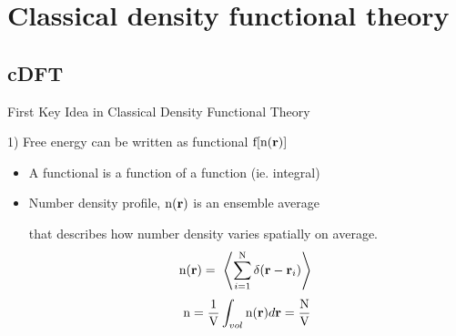 \documentclass{beamer}
\renewcommand{\vec}[1]{\mathbf{#1}}
\begin{document}
\section*{Classical density functional theory}
\subsection*{cDFT}
\begin{frame}{First Key Idea in Classical Density Functional Theory}
    \begin{block}{1) Free energy can be written as functional $\text f[\text{n}(\vec r)]$}  
       \begin{itemize}
          \item A functional is a function of a function (ie. integral)
          \item Number density profile, $\text n(\vec{r})$ is an ensemble average
          
           that describes how number density varies spatially on average. 
          \begin{displaymath}\text n(\vec r)=~\left<\sum_{i=1}^{\text N}\delta(\vec r - \vec r_i)\right>~\end{displaymath} 
          \begin{displaymath} \text n=\frac{1}{\text V}\int_{vol}{\text n(\vec{r})}{d\vec{r}}=\frac{\text N}{\text V}\end{displaymath}
        \end{itemize}
    \end{block}
\end{frame}  
  
\end{document}
